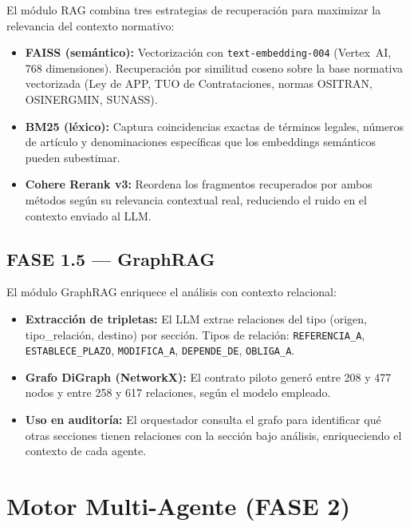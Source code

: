 El módulo RAG combina tres estrategias de recuperación para maximizar la
relevancia del contexto normativo:

\begin{itemize}
    \item \textbf{FAISS (semántico):} Vectorización con
    \texttt{text-embedding-004} (Vertex~AI, 768 dimensiones). Recuperación
    por similitud coseno sobre la base normativa vectorizada (Ley de APP,
    TUO de Contrataciones, normas OSITRAN, OSINERGMIN, SUNASS).
    \item \textbf{BM25 (léxico):} Captura coincidencias exactas de términos
    legales, números de artículo y denominaciones específicas que los
    embeddings semánticos pueden subestimar.
    \item \textbf{Cohere Rerank v3:} Reordena los fragmentos recuperados por
    ambos métodos según su relevancia contextual real, reduciendo el ruido
    en el contexto enviado al LLM.
\end{itemize}

\subsection{FASE 1.5 — GraphRAG}

El módulo GraphRAG enriquece el análisis con contexto relacional:

\begin{itemize}
    \item \textbf{Extracción de tripletas:} El LLM extrae relaciones del tipo
    (origen, tipo\_relación, destino) por sección. Tipos de relación:
    \texttt{REFERENCIA\_A}, \texttt{ESTABLECE\_PLAZO}, \texttt{MODIFICA\_A},
    \texttt{DEPENDE\_DE}, \texttt{OBLIGA\_A}.
    \item \textbf{Grafo DiGraph (NetworkX):} El contrato piloto generó entre
    208 y 477 nodos y entre 258 y 617 relaciones, según el modelo empleado.
    \item \textbf{Uso en auditoría:} El orquestador consulta el grafo para
    identificar qué otras secciones tienen relaciones con la sección bajo
    análisis, enriqueciendo el contexto de cada agente.
\end{itemize}

\section{Motor Multi-Agente (FASE 2)}

